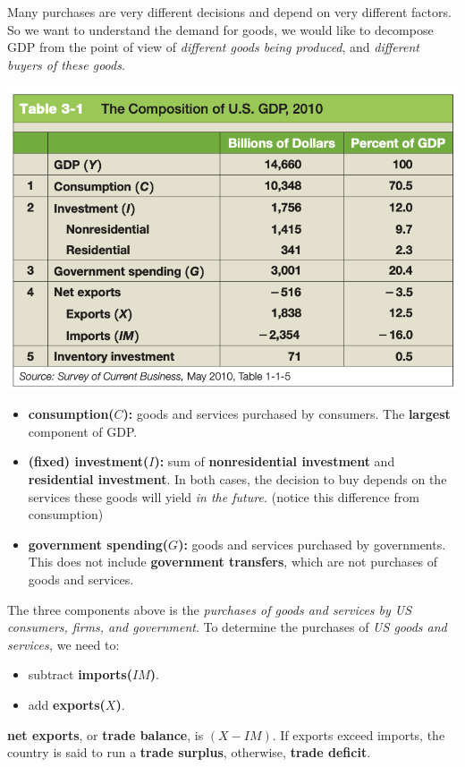 \documentclass[11pt, a4paper]{ECON2123}
\begin{document}
\begin{spacing}{1.5}
    Many purchases are very different decisions and depend on
    very different factors. So we want to understand the 
    demand for goods, we would like to decompose GDP from 
    the point of view of {\it different goods being produced},
    and {\it different buyers of these goods}.
    \begin{center}
        \includegraphics[scale=0.3]{images/03-composition-GDP.png}
    \end{center}
    \begin{itemize}
        \item {\bf consumption($C$):} goods and services purchased
        by consumers. The {\bf largest} component of GDP.
        \item {\bf (fixed) investment($I$):}  sum of 
        {\bf nonresidential investment} and {\bf residential investment}.
        In both cases, the decision to buy depends on the services 
        these goods will yield {\it in the future.} (notice this 
        difference from consumption)
        \item {\bf government spending($G$):} goods and services 
        purchased by governments. This does not include 
        {\bf government transfers}, which are not purchases
        of goods and services.
    \end{itemize}

    The three components above is the {\it purchases of goods and 
    services by US consumers, firms, and government}. To determine
    the purchases of {\it US goods and services,} we need to: 
    \begin{itemize}
        \item subtract {\bf imports($IM$)}.
        \item add {\bf exports($X$)}.
    \end{itemize}
    {\bf net exports}, or {\bf trade balance}, is $(X-IM)$. 
    If exports exceed imports, the country is said to run a 
    {\bf trade surplus}, otherwise, {\bf trade deficit}.



\end{spacing}
\end{document}

